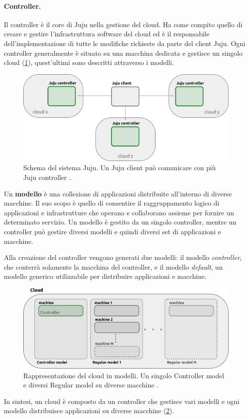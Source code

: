 \paragraph{Controller.} Il controller \cite{juju_controller} è il core di Juju nella gestione del cloud.
% 
Ha come compito quello di creare e gestire l'infrastruttura software del cloud ed è il responsabile dell'implementazione di tutte le modifiche richieste da parte del client Juju.
% 
Ogni controller generalmente è situato su una macchina dedicata e gestisce un singolo cloud (\cref{fig:juju_client_controllers}), quest'ultimi sono descritti attraverso i modelli.
% 
\begin{figure}[H]
    \centering
    \includegraphics[width=0.8\linewidth]{tesi/files/immagini/juju/client_controllers}
    \caption{Schema del sistema Juju. Un Juju client può comunicare con più Juju controller \cite{juju_client}.}
    \label{fig:juju_client_controllers}
\end{figure}

\noindent
Un \textbf{modello} \cite{juju_model} è una collezione di applicazioni distribuite all'interno di diverse macchine.
% 
Il suo scopo è quello di consentire il raggruppamento logico di applicazioni e infrastrutture che operano e collaborano assieme per fornire un determinato servizio. 
% 
Un modello è gestito da un singolo controller, mentre un controller può gestire diversi modelli e quindi diversi set di applicazioni e macchine.

Alla creazione del controller vengono generati due modelli: il modello \emph{controller}, che conterrà solamente la macchina del controller, e il modello \emph{default}, un modello generico utilizzabile per distribuire applicazioni e macchine.
% 
\begin{figure}[H]
    \centering
    \includegraphics[width=0.8\linewidth]{tesi/files/immagini/juju/models}
    \caption{Rappresentazione del cloud in modelli. Un singolo Controller model e diversi Regular model su diverse macchine \cite{juju_model}.}
    \label{fig:juju_models}
\end{figure}
% 
\noindent 
In sintesi, un cloud è composto da un controller che gestisce vari modelli e ogni modello distribuisce applicazioni su diverse macchine (\cref{fig:juju_models}).
 

